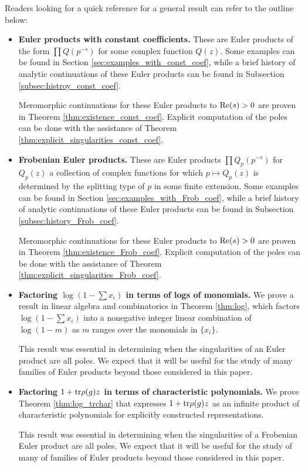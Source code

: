 \documentclass[12pt]{amsart}
\theoremstyle{plain}
\begin{document}
Readers looking for a quick reference for a general result can refer to the outline below:
\begin{itemize}
    \item \textbf{Euler products with constant coefficients.} These are Euler products of the form $\prod Q(p^{-s})$ for some complex function $Q(z)$. Some examples can be found in Section \ref{sec:examples_with_const_coef}, while a brief history of analytic continuations of these Euler products can be found in Subsection \ref{subsec:histroy_const_coef}.

    Meromorphic continuations for these Euler products to ${\rm Re}(s) > 0$ are proven in Theorem \ref{thm:existence_const_coef}. Explicit computation of the poles can be done with the assistance of Theorem \ref{thm:explicit_singularities_const_coef}.

    \item \textbf{Frobenian Euler products.} These are Euler products $\prod Q_p(p^{-s})$ for $Q_p(z)$ a collection of complex functions for which $p\mapsto Q_p(z)$ is determined by the splitting type of $p$ in some finite extension. Some examples can be found in Section \ref{sec:examples_with_Frob_coef}, while a brief history of analytic continuations of these Euler products can be found in Subsection \ref{subsec:history_Frob_coef}.

    Meromorphic continuations for these Euler products to ${\rm Re}(s) > 0$ are proven in Theorem \ref{thm:existence_Frob_coef}. Explicit computation of the poles can be done with the assistance of Theorem \ref{thm:explicit_singularities_Frob_coef}.

    \item \textbf{Factoring $\log(1-\sum x_i)$ in terms of logs of monomials.} We prove a result in linear algebra and combinatorics in Theorem \ref{thm:log}, which factors $\log(1-\sum x_i)$ into a nonegative integer linear combination of $\log(1-m)$ as $m$ ranges over the monomials in $\{x_i\}$.

    This result was essential in determining when the singularities of an Euler product are all poles. We expect that it will be useful for the study of many families of Euler products beyond those considered in this paper.

    \item \textbf{Factoring $1+{\rm tr}\rho(g)z$ in terms of characteristic polynomials.} We prove Theorem \ref{thm:log_trchar} that expresses $1+{\rm tr}\rho(g)z$ as an infinite product of characteristic polynomials for explicitly constructed representations.

    This result was essential in determining when the singularities of a Frobenian Euler product are all poles. We expect that it will be useful for the study of many of families of Euler products beyond those considered in this paper.
\end{itemize}
\end{document}
